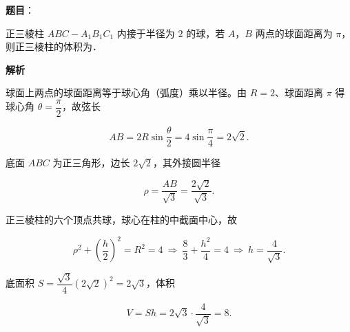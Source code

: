 \begin{answer}

\textbf{题目}：

正三棱柱 $ABC-A_1B_1C_1$ 内接于半径为 $2$ 的球，若 $A$，$B$ 两点的球面距离为 $\pi$，则正三棱柱的体积为\gkblank{}．

\textbf{解析}

球面上两点的球面距离等于球心角（弧度）乘以半径。由 $R=2$、球面距离 $\pi$ 得球心角 $\theta=\dfrac{\pi}{2}$，故弦长

\nopagebreak[4]
\[AB=2R\sin\frac\theta2=4\sin\frac{\pi}{4}=2\sqrt2.\]

底面 $ABC$ 为正三角形，边长 $2\sqrt2$，其外接圆半径

\nopagebreak[4]
\[\rho=\frac{AB}{\sqrt3}=\frac{2\sqrt2}{\sqrt3}.\]

正三棱柱的六个顶点共球，球心在柱的中截面中心，故

\nopagebreak[4]
\[\rho^2+\left(\frac h2\right)^2=R^2=4\ \Longrightarrow\ \frac83+\frac{h^2}{4}=4\ \Longrightarrow\ h=\frac4{\sqrt3}.\]

底面积 $S=\dfrac{\sqrt3}{4}(2\sqrt2)^2=2\sqrt3$，体积

\nopagebreak[4]
\[V=Sh=2\sqrt3\cdot\frac4{\sqrt3}=8.\]


\end{answer}
